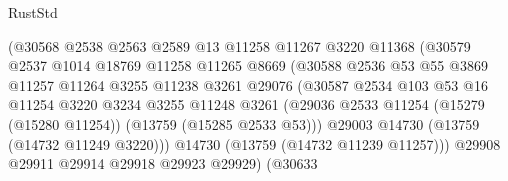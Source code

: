 \begin{lexlean}{RustStd}
\begin{coremodule}
                                  (@30568
                                    @2538
                                    @2563
                                    @2589
                                    @13
                                    @11258
                                    @11267
                                    @3220
                                    @11368
                                    (@30579
                                      @2537
                                      @1014
                                      @18769
                                      @11258
                                      @11265
                                      @8669
                                      (@30588
                                        @2536
                                        @53
                                        @55
                                        @3869
                                        @11257
                                        @11264
                                        @3255
                                        @11238
                                        @3261
                                        @29076
                                        (@30587
                                          @2534
                                          @103
                                          @53
                                          @16
                                          @11254
                                          @3220
                                          @3234
                                          @3255
                                          @11248
                                          @3261
                                          (@29036
                                            @2533
                                            @11254
                                            (@15279 (@15280 @11254))
                                            (@13759 (@15285 @2533 @53)))
                                          @29003
                                          @14730
                                          (@13759 (@14732 @11249 @3220)))
                                        @14730
                                        (@13759 (@14732 @11239 @11257)))
                                      @29908
                                      @29911
                                      @29914
                                      @29918
                                      @29923
                                      @29929)
                                    (@30633

\end{coremodule}
\end{lexlean}
